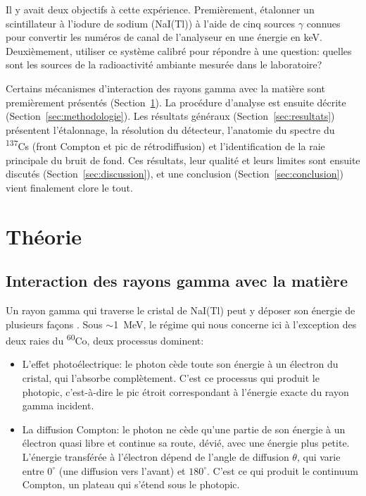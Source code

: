 \documentclass[11pt,letterpaper]{article}
\begin{document}
Il y avait deux objectifs à cette expérience. Premièrement, étalonner un scintillateur à l'iodure de sodium (NaI(Tl)) à l'aide de cinq sources $\gamma$ connues pour convertir les numéros de canal de l'analyseur en une énergie en keV. Deuxièmement, utiliser ce système calibré pour répondre à une question: quelles sont les sources de la radioactivité ambiante mesurée dans le laboratoire?

Certains mécanismes d'interaction des rayons gamma avec la matière sont premièrement présentés (Section~\ref{sec:theorie}). La procédure d'analyse est ensuite décrite (Section~\ref{sec:methodologie}). Les résultats généraux (Section~\ref{sec:resultats}) présentent l'étalonnage, la résolution du détecteur, l'anatomie du spectre du \textsuperscript{137}Cs (front Compton et pic de rétrodiffusion) et l'identification de la raie principale du bruit de fond. Ces résultats, leur qualité et leurs limites sont ensuite discutés (Section~\ref{sec:discussion}), et une conclusion (Section~\ref{sec:conclusion}) vient finalement clore le tout.

\section{Théorie}
\label{sec:theorie}

\subsection{Interaction des rayons gamma avec la matière}

Un rayon gamma qui traverse le cristal de NaI(Tl) peut y déposer son énergie de plusieurs façons \cite{knoll}. Sous $\sim$1~MeV, le régime qui nous concerne ici à l'exception des deux raies du \textsuperscript{60}Co, deux processus dominent:

\begin{itemize}
    \item L'effet photoélectrique: le photon cède toute son énergie à un électron du cristal, qui l'absorbe complètement. C'est ce processus qui produit le photopic, c'est-à-dire le pic étroit correspondant à l'énergie exacte du rayon gamma incident.
    \item La diffusion Compton: le photon ne cède qu'une partie de son énergie à un électron quasi libre et continue sa route, dévié, avec une énergie plus petite. L'énergie transférée à l'électron dépend de l'angle de diffusion $\theta$, qui varie entre $0^\circ$ (une diffusion vers l'avant) et $180^\circ$. C'est ce qui produit le continuum Compton, un plateau qui s'étend sous le photopic.
\end{itemize}
\end{document}
